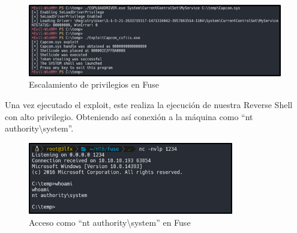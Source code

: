\begin{figure}[H]
    \centering
    \includegraphics[width=0.99\textwidth]{imagenes/escprivfuse.png}
    \caption{Escalamiento de privilegios en Fuse}
\end{figure}
Una vez ejecutado el exploit, este realiza la ejecución de nuestra Reverse Shell con alto privilegio. Obteniendo así conexión a la máquina como “nt authority\textbackslash{}system”.
\begin{figure}[H]
    \centering
    \includegraphics[width=0.8\textwidth]{imagenes/acntfuse.png}
    \caption{Acceso como ``nt authority\textbackslash{}system'' en Fuse}
\end{figure}
